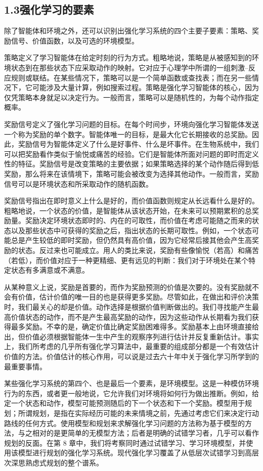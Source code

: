 \documentclass[UTF8, 12pt, fontset=fandol, oneside]{ctexart}
\begin{document}
\subsection*{1.3\quad 强化学习的要素}

除了智能体和环境之外，还可以识别出强化学习系统的四个主要子要素：策略、奖励信号、价值函数，以及可选的环境模型。

策略定义了学习智能体在给定时刻的行为方式。粗略地说，策略是从被感知到的环境状态到在那些状态下应采取动作的映射。它对应于心理学中所谓的一组刺激--反应规则或联结。在某些情况下，策略可以是一个简单函数或查找表；而在另一些情况下，它可能涉及大量计算，例如搜索过程。策略是强化学习智能体的核心，因为仅凭策略本身就足以决定行为。一般而言，策略可以是随机性的，为每个动作指定概率。

奖励信号定义了强化学习问题的目标。在每个时间步，环境向强化学习智能体发送一个称为奖励的单个数字。智能体唯一的目标，是最大化它长期接收的总奖励。因此，奖励信号为智能体定义了什么是好事件、什么是坏事件。在生物系统中，我们可以把奖励看作类似于愉悦或痛苦的经验。它们是智能体所面对问题的即时而定义性的特征。奖励信号是改变策略的主要依据；如果策略选择的某个动作随后得到低奖励，那么将来在该情境下，策略可能会被改变为选择其他动作。一般而言，奖励信号可以是环境状态和所采取动作的随机函数。

奖励信号指出在即时意义上什么是好的，而价值函数则规定从长远看什么是好的。粗略地说，一个状态的价值，是智能体从该状态开始，在未来可以预期累积的总奖励量。奖励决定环境状态即时的、内在的可取性，而价值在考虑可能随之而来的状态以及那些状态中可获得的奖励之后，指出状态的长期可取性。例如，一个状态可能总是产生较低的即时奖励，但仍然具有高价值，因为它经常后接其他会产生高奖励的状态。反过来也可能成立。用人的类比来说，奖励有些像愉悦（若高）和痛苦（若低），而价值对应于一种更精细、更有远见的判断：我们对于环境处在某个特定状态有多满意或不满意。

从某种意义上说，奖励是首要的，而作为奖励预测的价值是次要的。没有奖励就不会有价值，估计价值的唯一目的也是获得更多奖励。尽管如此，在做出和评价决策时，我们最关心的却是价值。动作选择是根据价值判断做出的。我们寻找能产生最高价值状态的动作，而不是产生最高奖励的动作，因为这些动作从长期看为我们获得最多奖励。不幸的是，确定价值比确定奖励困难得多。奖励基本上由环境直接给出，但价值必须根据智能体一生中产生的观察序列进行估计并反复重新估计。事实上，我们所考虑的几乎所有强化学习算法中，最重要的组成部分都是一个有效估计价值的方法。价值估计的核心作用，可以说是过去六十年中关于强化学习所学到的最重要事情。

某些强化学习系统的第四个、也是最后一个要素，是环境模型。这是一种模仿环境行为的东西，或者更一般地说，它允许我们对环境将如何行为做出推断。例如，给定一个状态和动作，模型可能预测随后的下一个状态和下一个奖励。模型用于规划；所谓规划，是指在实际经历可能的未来情境之前，先通过考虑它们来决定行动路线的任何方式。使用模型和规划来求解强化学习问题的方法称为基于模型的方法，与之相对的是更简单的无模型方法；后者是明确的试错学习者，几乎可以看作规划的反面。在第 8 章中，我们将考察同时通过试错学习、学习环境模型，并使用该模型进行规划的强化学习系统。现代强化学习覆盖了从低层次试错学习到高层次深思熟虑式规划的整个谱系。
\end{document}
